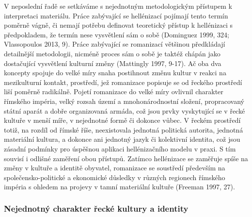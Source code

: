 V neposlední řadě se setkáváme s nejednotným metodologickým přístupem k interpretaci materiálu. Práce zabývající se hellénizací pojímají tento termín poměrně vágně, či nemají potřebu definovat teoretický přístup k hellénizaci s předpokladem, že termín nese vysvětlení sám o sobě (Dominguez 1999, 324; Vlassopoulos 2013, 9). Práce zabývající se romanizací většinou předkládají detailnější metodologii, nicméně proces sám o sobě je taktéž chápán jako dostačující vysvětlení kulturní změny (Mattingly 1997, 9-17). Ač oba dva koncepty spojuje do velké míry snaha postihnout změnu kultur v reakci na mezikulturní kontakt, prostředí, jež romanizace popisuje se od řeckého prostředí liší poměrně radikálně. Pojetí romanizace do velké míry ovlivnil charakter římského impéria, velký rozsah území a mnohonárodnostní složení, propracovaný státní aparát a dobře organizovaná armáda, což jsou prvky vyskytující se v řecké kultuře v menší míře, v nejednotné formě či dokonce vůbec. V řeckém prostředí totiž, na rozdíl od římské říše, neexistovala jednotná politická autorita, jednotná materiální kultura, a dokonce ani jednotný jazyk či kolektivní identita, což jsou zásadní podmínky pro úspěšnou aplikaci hellénizačního modelu v praxi. S tím souvisí i odlišné zaměření obou přístupů. Zatímco hellénizace se zaměřuje spíše na změny v kultuře a identitě obyvatel, romanizace se soustředí především na společensko-politické a ekonomické důsledky v různých regionech římského impéria s ohledem na projevy v tamní materiální kultuře (Freeman 1997, 27).

\subsubsection[nejednotný-charakter-řecké-kultury-a-identity]{Nejednotný charakter řecké kultury a identity}

